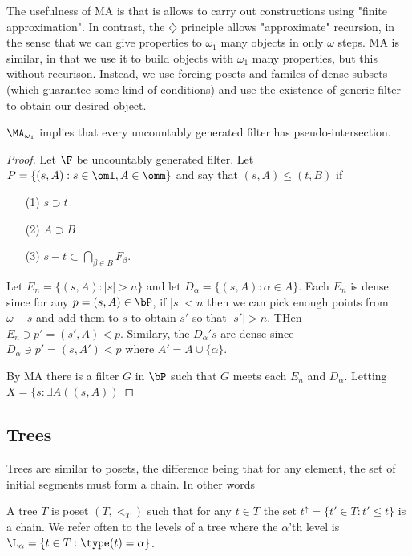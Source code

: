 \documentclass{article}
\begin{document}
 The usefulness of MA is that is allows to carry out constructions using "finite approximation". In contrast, the \(\diamondsuit\) principle allows "approximate" recursion, in the sense that we can give  properties to \(\omega_1\) many objects in only \(\omega\) steps. MA is similar, in that we use it to build objects with \(\omega_1\) many properties, but this without recurison. Instead, we use forcing posets and familes of dense subsets (which guarantee some kind of conditions) and use the existence of generic filter to obtain our desired object. 

 \begin{exam}
    \(\MA_{\omega_1}\) implies that every uncountably generated filter has pseudo-intersection. 
 \end{exam}
 \begin{proof}
    Let \(\F\) be uncountably generated filter. Let \(P = \{(s, A) : s \in \oml, A \in \omm\}\) and say that \((s, A) \leq (t, B)\) if 
    \begin{enumerate}
        \item[(1)] \(s \supset t\)
        \item[(2)] \(A \supset B\)
        \item[(3)] \(s - t \subset \bigcap_{\beta \in B} F_{\beta}\).
    \end{enumerate}
    Let \(E_n = \{(s, A): |s| > n\}\) and let \(D_{\alpha} = \{(s, A) : \alpha \in A\}\). Each \(E_n\) is dense since for any \(p = (s, A) \in \bP\), if \(|s| < n\) then we can  pick enough points from \(\omega - s\) and add them to \(s\) to obtain \(s'\) so that \(|s'| > n\). THen \(E_n \ni p' = (s', A) < p\). Similary, the \(D_{\alpha}'s\) are dense since \(D_{\alpha} \ni p' = (s, A') < p\) where \(A' = A \cup \{\alpha\}\).

    By MA there is a filter \(G\) in \(\bP\) such that \(G\) meets each \(E_n\) and \(D_{\alpha}\).  Letting \(X = \{s : \exists A((s,A))\)
 \end{proof}

\subsection{Trees}

Trees are similar to posets, the difference being that for any element, the set of initial segments must form a chain. In other words

\begin{defn}
    A tree \(T\) is poset \((T, <_T)\) such that for any \(t \in T\) the set \(t^{\uparrow} = \{t' \in T: t' \leq t\}\) is a chain. We refer often to the levels of a tree where the \(\alpha\)'th level is \(\L_{\alpha} = \{t \in T: \type(t) = \alpha\}\).
\end{defn}
 
\end{document}
